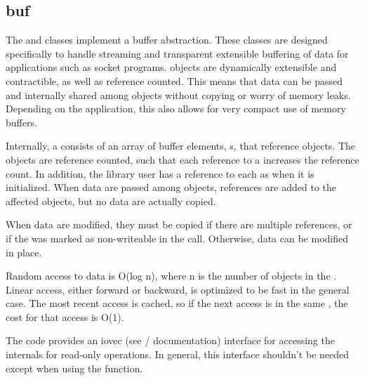 %
%
%
%
%              

\subsection{buf}
\label{buf}

The  and  classes implement a buffer abstraction.
These classes are designed specifically to handle streaming and transparent
extensible buffering of data for applications such as socket programs.
 objects are dynamically extensible and contractible, as well as
reference counted.  This means that data can be passed and internally shared
among  objects without copying or worry of memory leaks.
Depending on the application, this also allows for very compact use of memory
buffers.

Internally, a  consists of an array of buffer elements,
s, that reference  objects.  The
 objects are reference counted, such that each 
reference to a  increases the  reference count.
In addition, the library user has a reference to each  as when
it is initialized.  When data are passed among  objects,
references are added to the affected  objects, but no data are
actually copied.

When data are modified, they must be copied if there are multiple references, or
if the  was marked as non-writeable in the
 call.  Otherwise, data can be modified in place.

Random access to data is O(log n), where n is the number of 
objects in the .  Linear access, either forward or backward, is
optimized to be fast in the general case.  The most recent access is cached, so
if the next access is in the same , the cost for that access is
O(1).

The  code provides an iovec (see /
documentation) interface for accessing the internals for read-only operations.
In general, this interface shouldn't be needed except when using the
 function.

